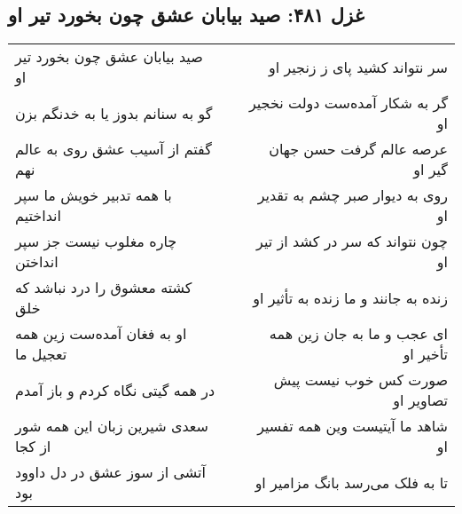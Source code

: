 \begin{center}
\section*{غزل ۴۸۱: صید بیابان عشق چون بخورد تیر او}
\label{sec:481}
\begin{longtable}{l p{0.5cm} r}
صید بیابان عشق چون بخورد تیر او
&&
سر نتواند کشید پای ز زنجیر او
\\
گو به سنانم بدوز یا به خدنگم بزن
&&
گر به شکار آمده‌ست دولت نخجیر او
\\
گفتم از آسیب عشق روی به عالم نهم
&&
عرصه عالم گرفت حسن جهان گیر او
\\
با همه تدبیر خویش ما سپر انداختیم
&&
روی به دیوار صبر چشم به تقدیر او
\\
چاره مغلوب نیست جز سپر انداختن
&&
چون نتواند که سر در کشد از تیر او
\\
کشته معشوق را درد نباشد که خلق
&&
زنده به جانند و ما زنده به تأثیر او
\\
او به فغان آمده‌ست زین همه تعجیل ما
&&
ای عجب و ما به جان زین همه تأخیر او
\\
در همه گیتی نگاه کردم و باز آمدم
&&
صورت کس خوب نیست پیش تصاویر او
\\
سعدی شیرین زبان این همه شور از کجا
&&
شاهد ما آیتیست وین همه تفسیر او
\\
آتشی از سوز عشق در دل داوود بود
&&
تا به فلک می‌رسد بانگ مزامیر او
\\
\end{longtable}
\end{center}

